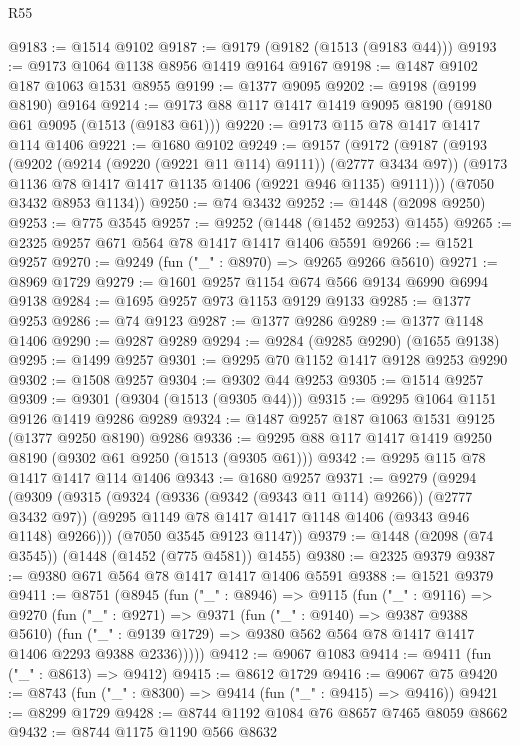\begin{lexlean}{R55}
\begin{coremodule}
{{@9183 := @1514 @9102
@9187 := @9179 (@9182 (@1513 (@9183 @44)))
@9193 := @9173 @1064 @1138 @8956 @1419 @9164 @9167
@9198 := @1487 @9102 @187 @1063 @1531 @8955
@9199 := @1377 @9095
@9202 := @9198 (@9199 @8190) @9164
@9214 := @9173 @88 @117 @1417 @1419 @9095 @8190 (@9180 @61 @9095 (@1513 (@9183 @61)))
@9220 := @9173 @115 @78 @1417 @1417 @114 @1406
@9221 := @1680 @9102
@9249 := @9157
    (@9172
      (@9187
        (@9193
          (@9202 (@9214 (@9220 (@9221 @11 @114) @9111)) (@2777 @3434 @97))
          (@9173 @1136 @78 @1417 @1417 @1135 @1406 (@9221 @946 @1135) @9111)))
      (@7050 @3432 @8953 @1134))
@9250 := @74 @3432
@9252 := @1448 (@2098 @9250)
@9253 := @775 @3545
@9257 := @9252 (@1448 (@1452 @9253) @1455)
@9265 := @2325 @9257 @671 @564 @78 @1417 @1417 @1406 @5591
@9266 := @1521 @9257
@9270 := @9249 (fun ("_" : @8970) => @9265 @9266 @5610)
@9271 := @8969 @1729
@9279 := @1601 @9257 @1154 @674 @566 @9134 @6990 @6994 @9138
@9284 := @1695 @9257 @973 @1153 @9129 @9133
@9285 := @1377 @9253
@9286 := @74 @9123
@9287 := @1377 @9286
@9289 := @1377 @1148 @1406
@9290 := @9287 @9289
@9294 := @9284 (@9285 @9290) (@1655 @9138)
@9295 := @1499 @9257
@9301 := @9295 @70 @1152 @1417 @9128 @9253 @9290
@9302 := @1508 @9257
@9304 := @9302 @44 @9253
@9305 := @1514 @9257
@9309 := @9301 (@9304 (@1513 (@9305 @44)))
@9315 := @9295 @1064 @1151 @9126 @1419 @9286 @9289
@9324 := @1487 @9257 @187 @1063 @1531 @9125 (@1377 @9250 @8190) @9286
@9336 := @9295 @88 @117 @1417 @1419 @9250 @8190 (@9302 @61 @9250 (@1513 (@9305 @61)))
@9342 := @9295 @115 @78 @1417 @1417 @114 @1406
@9343 := @1680 @9257
@9371 := @9279
    (@9294
      (@9309
        (@9315
          (@9324 (@9336 (@9342 (@9343 @11 @114) @9266)) (@2777 @3432 @97))
          (@9295 @1149 @78 @1417 @1417 @1148 @1406 (@9343 @946 @1148) @9266)))
      (@7050 @3545 @9123 @1147))
@9379 := @1448 (@2098 (@74 @3545)) (@1448 (@1452 (@775 @4581)) @1455)
@9380 := @2325 @9379
@9387 := @9380 @671 @564 @78 @1417 @1417 @1406 @5591
@9388 := @1521 @9379
@9411 := @8751
    (@8945
      (fun ("_" : @8946) =>
      @9115
        (fun ("_" : @9116) =>
        @9270
          (fun ("_" : @9271) =>
          @9371
            (fun ("_" : @9140) => @9387 @9388 @5610)
            (fun ("_" : @9139 @1729) => @9380 @562 @564 @78 @1417 @1417 @1406 @2293 @9388 @2336)))))
@9412 := @9067 @1083
@9414 := @9411 (fun ("_" : @8613) => @9412)
@9415 := @8612 @1729
@9416 := @9067 @75
@9420 := @8743 (fun ("_" : @8300) => @9414 (fun ("_" : @9415) => @9416))
@9421 := @8299 @1729
@9428 := @8744 @1192 @1084 @76 @8657 @7465 @8059 @8662
@9432 := @8744 @1175 @1190 @566 @8632
}}
\end{coremodule}
\end{lexlean}
